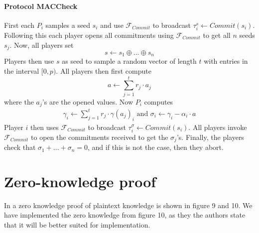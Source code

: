\documentclass[../main.tex]{subfiles}
\begin{document}
\paragraph{Protocol MACCheck}
First each $P_i$ samples a seed $s_i$ and use $\mathcal{F}_{Commit}$ to broadcast $\tau^s_i \leftarrow Commit(s_i)$. Following this each player opens all commitments using $\mathcal{F}_{Commit}$ to get all $n$ seeds $s_j$. Now, all players set $$s \leftarrow s_1 \oplus ... \oplus s_n$$
Players then use $s$ as seed to sample a random vector of length $t$ with entries in the interval $[0, p)$. %
All players then first compute $$a \leftarrow \sum^t_{j = 1} r_j \cdot a_j$$ where the $a_j$'s are the opened values.
Now $P_i$ computes
\begin{align*}
    \gamma_i \leftarrow \sum^t_{j = 1} r_j \cdot \gamma(a_j)_i \text{  and  } \sigma_i \leftarrow \gamma_i - \alpha_i \cdot a
\end{align*}
Player $i$ then uses $\mathcal{F}_{Commit}$ to broadcast $\tau^\sigma_i \leftarrow Commit(s_i)$.
All players invoke $\mathcal{F}_{Commit}$ to open the commitments received to get the $\sigma_j$'s.
Finally, the players check that $\sigma_1 + ... + \sigma_n = 0$, and if this is not the case, then they abort.

\section{Zero-knowledge proof}
    In \cite{damgaard2012multiparty} a zero knowledge proof of plaintext knowledge is shown in figure 9 and 10.
    We have implemented the zero knowledge from figure 10, as they the authors state that it will be better suited for implementation.
\end{document}
